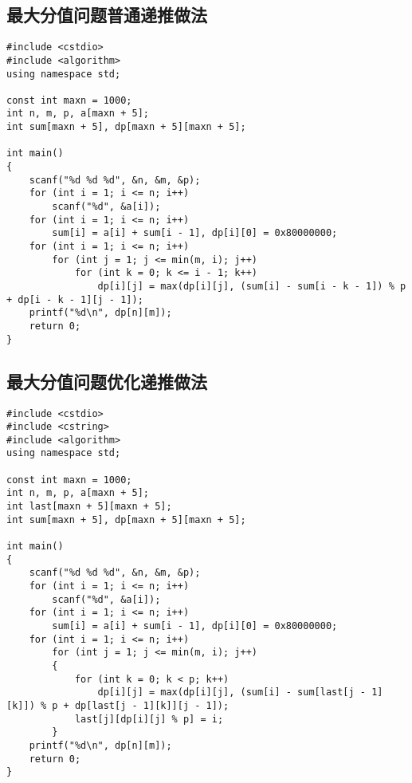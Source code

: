 \documentclass{article}
\begin{document}
\subsection{最大分值问题普通递推做法}

\begin{lstlisting}
#include <cstdio>
#include <algorithm>
using namespace std;

const int maxn = 1000;
int n, m, p, a[maxn + 5];
int sum[maxn + 5], dp[maxn + 5][maxn + 5];

int main()
{
    scanf("%d %d %d", &n, &m, &p);
    for (int i = 1; i <= n; i++)
        scanf("%d", &a[i]);
    for (int i = 1; i <= n; i++)
        sum[i] = a[i] + sum[i - 1], dp[i][0] = 0x80000000;
    for (int i = 1; i <= n; i++)
        for (int j = 1; j <= min(m, i); j++)
            for (int k = 0; k <= i - 1; k++)
                dp[i][j] = max(dp[i][j], (sum[i] - sum[i - k - 1]) % p + dp[i - k - 1][j - 1]);
    printf("%d\n", dp[n][m]);
    return 0;
}
\end{lstlisting}

\subsection{最大分值问题优化递推做法}

\begin{lstlisting}
#include <cstdio>
#include <cstring>
#include <algorithm>
using namespace std;

const int maxn = 1000;
int n, m, p, a[maxn + 5];
int last[maxn + 5][maxn + 5];
int sum[maxn + 5], dp[maxn + 5][maxn + 5];

int main()
{
    scanf("%d %d %d", &n, &m, &p);
    for (int i = 1; i <= n; i++)
        scanf("%d", &a[i]);
    for (int i = 1; i <= n; i++)
        sum[i] = a[i] + sum[i - 1], dp[i][0] = 0x80000000;
    for (int i = 1; i <= n; i++)
        for (int j = 1; j <= min(m, i); j++)
        {
            for (int k = 0; k < p; k++)
                dp[i][j] = max(dp[i][j], (sum[i] - sum[last[j - 1][k]]) % p + dp[last[j - 1][k]][j - 1]);
            last[j][dp[i][j] % p] = i;
        }
    printf("%d\n", dp[n][m]);
    return 0;
}
\end{lstlisting}
\end{document}
